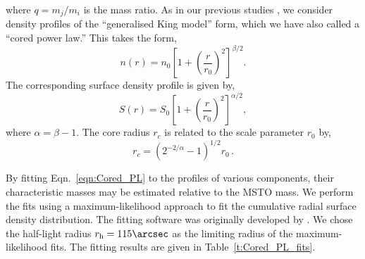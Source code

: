 \documentclass[fleqn,usenatbib]{mnras}
\begin{document}
%
\noindent where $q = m_j/m_i$ is the mass ratio. As in our previous studies \citep{Cohn10,Lugger17}, we consider density profiles of the ``generalised King model'' form, which we have also called a ``cored power law.'' This takes the form,
%
\begin{equation}
    n(r) = n_0 \left[1 + \left(\frac{r}{r_0}\right)^2\right]^{\beta/2}.
\end{equation}
%
The corresponding surface density profile is given by,
%
\begin{equation}
\label{eqn:Cored_PL} 
S(r) = S_0 \left[1 + \left({\frac{r}{r_0}}\right)^2 \right]^{\alpha/2},
\end{equation}
%
where $\alpha = \beta -1$. The core radius $r_c$ is related to the scale parameter $r_0$ by,
%
\begin{equation}
r_c = \left(2^{-2/\alpha} -1 \right)^{1/2} r_0\,.
\end{equation}
%

By fitting Eqn.~\ref{eqn:Cored_PL} to the profiles of various components, their characteristic masses may be estimated relative to the MSTO mass.  We perform the fits using a maximum-likelihood approach to fit the cumulative radial surface density distribution. The fitting software was originally developed by \citet{Slavin03}. We chose the half-light radius $r_\mathrm{h} = 115\arcsec$ as the limiting radius of the maximum-likelihood fits. The fitting results are given in Table~\ref{t:Cored_PL_fits}. 
\end{document}
